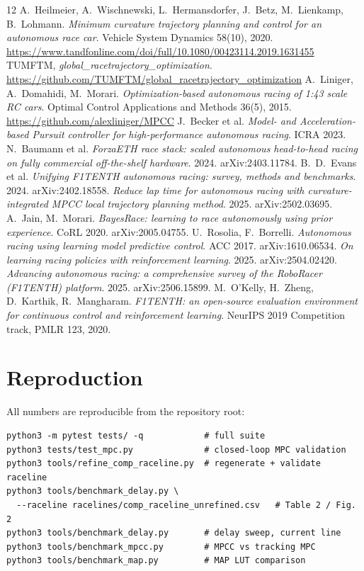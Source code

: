 \documentclass[11pt]{article}
\begin{document}
\begin{thebibliography}{12}
 A.~Heilmeier, A.~Wischnewski, L.~Hermansdorfer,
  J.~Betz, M.~Lienkamp, B.~Lohmann.
  \emph{Minimum curvature trajectory planning and control for an
  autonomous race car}. Vehicle System Dynamics 58(10), 2020.
  \url{https://www.tandfonline.com/doi/full/10.1080/00423114.2019.1631455}
 TUMFTM, \emph{global\_racetrajectory\_optimization}.
  \url{https://github.com/TUMFTM/global_racetrajectory_optimization}
 A.~Liniger, A.~Domahidi, M.~Morari.
  \emph{Optimization-based autonomous racing of 1:43 scale RC cars}.
  Optimal Control Applications and Methods 36(5), 2015.
  \url{https://github.com/alexliniger/MPCC}
 J.~Becker et al.
  \emph{Model- and Acceleration-based Pursuit controller for
  high-performance autonomous racing}. ICRA 2023.
 N.~Baumann et al.
  \emph{ForzaETH race stack: scaled autonomous head-to-head racing on
  fully commercial off-the-shelf hardware}. 2024.
  arXiv:2403.11784.
 B.~D.~Evans et al.
  \emph{Unifying F1TENTH autonomous racing: survey, methods and
  benchmarks}. 2024. arXiv:2402.18558.
 \emph{Reduce lap time for autonomous racing with
  curvature-integrated MPCC local trajectory planning method}. 2025.
  arXiv:2502.03695.
 A.~Jain, M.~Morari.
  \emph{BayesRace: learning to race autonomously using prior
  experience}. CoRL 2020. arXiv:2005.04755.
 U.~Rosolia, F.~Borrelli.
  \emph{Autonomous racing using learning model predictive control}.
  ACC 2017. arXiv:1610.06534.
 \emph{On learning racing policies with reinforcement
  learning}. 2025. arXiv:2504.02420.
 \emph{Advancing autonomous racing: a comprehensive
  survey of the RoboRacer (F1TENTH) platform}. 2025. arXiv:2506.15899.
 M.~O'Kelly, H.~Zheng, D.~Karthik, R.~Mangharam.
  \emph{F1TENTH: an open-source evaluation environment for continuous
  control and reinforcement learning}. NeurIPS 2019 Competition track,
  PMLR 123, 2020.
\end{thebibliography}

\appendix
\section{Reproduction}

All numbers are reproducible from the repository root:

\begin{verbatim}
python3 -m pytest tests/ -q            # full suite
python3 tests/test_mpc.py              # closed-loop MPC validation
python3 tools/refine_comp_raceline.py  # regenerate + validate raceline
python3 tools/benchmark_delay.py \
  --raceline racelines/comp_raceline_unrefined.csv   # Table 2 / Fig. 2
python3 tools/benchmark_delay.py       # delay sweep, current line
python3 tools/benchmark_mpcc.py        # MPCC vs tracking MPC
python3 tools/benchmark_map.py         # MAP LUT comparison
\end{verbatim}
\end{document}
